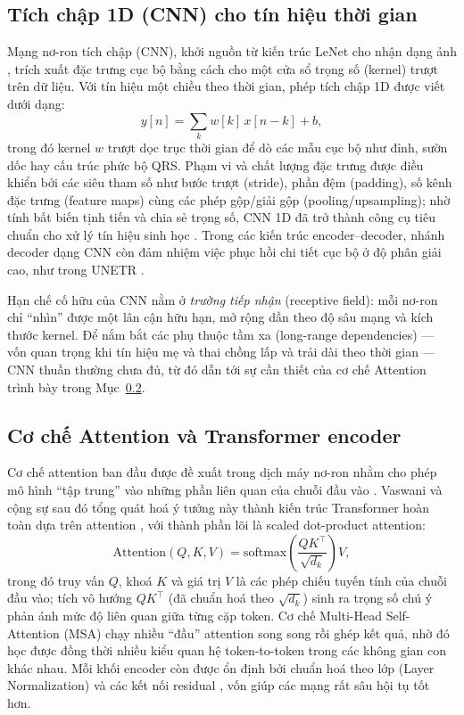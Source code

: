 \documentclass[../DoAn.tex]{subfiles}
\begin{document}
\subsection{Tích chập 1D (CNN) cho tín hiệu thời gian}

Mạng nơ-ron tích chập (CNN), khởi nguồn từ kiến trúc LeNet cho nhận dạng ảnh
\cite{lecunGradientbasedLearningApplied1998}, trích xuất đặc trưng cục bộ bằng cách cho một cửa sổ trọng số
(kernel) trượt trên dữ liệu. Với tín hiệu một chiều theo thời gian, phép tích chập 1D
được viết dưới dạng:
\begin{equation}
  y[n]=\sum_{k} w[k]\,x[n-k]+b,
\end{equation}
trong đó kernel $w$ trượt dọc trục thời gian để dò các mẫu cục bộ như đỉnh, sườn dốc
hay cấu trúc phức bộ QRS. Phạm vi và chất lượng đặc trưng được điều khiển bởi các siêu
tham số như bước trượt (stride), phần đệm (padding), số kênh đặc trưng (feature maps)
cùng các phép gộp/giải gộp (pooling/upsampling); nhờ tính bất biến tịnh tiến và chia sẻ
trọng số, CNN 1D đã trở thành công cụ tiêu chuẩn cho xử lý tín hiệu sinh học
\cite{kiranyaz1DConvolutionalNeural2019}. Trong các kiến trúc encoder--decoder, nhánh decoder dạng CNN còn
đảm nhiệm việc phục hồi chi tiết cục bộ ở độ phân giải cao, như trong UNETR
\cite{hatamizadehUNETRTransformers3D2021}.

Hạn chế cố hữu của CNN nằm ở \emph{trường tiếp nhận} (receptive field): mỗi nơ-ron chỉ
``nhìn'' được một lân cận hữu hạn, mở rộng dần theo độ sâu mạng và kích thước kernel.
Để nắm bắt các phụ thuộc tầm xa (long-range dependencies) --- vốn quan trọng khi tín
hiệu mẹ và thai chồng lấp và trải dài theo thời gian --- CNN thuần thường chưa đủ, từ đó
dẫn tới sự cần thiết của cơ chế Attention trình bày trong Mục~\ref{sec:attention}.

\subsection{Cơ chế Attention và Transformer encoder}
\label{sec:attention}

Cơ chế attention ban đầu được đề xuất trong dịch máy nơ-ron nhằm cho phép mô hình
``tập trung'' vào những phần liên quan của chuỗi đầu vào \cite{bahdanauNeuralMachineTranslation2016}.
Vaswani và cộng sự sau đó tổng quát hoá ý tưởng này thành kiến trúc Transformer hoàn
toàn dựa trên attention \cite{vaswaniAttentionAllYou2023}, với thành phần lõi là scaled
dot-product attention:
\begin{equation}
  \mathrm{Attention}(Q,K,V)=\mathrm{softmax}\!\left(\frac{QK^\top}{\sqrt{d_k}}\right)V,
\end{equation}
trong đó truy vấn $Q$, khoá $K$ và giá trị $V$ là các phép chiếu tuyến tính của chuỗi
đầu vào; tích vô hướng $QK^\top$ (đã chuẩn hoá theo $\sqrt{d_k}$) sinh ra trọng số chú
ý phản ánh mức độ liên quan giữa từng cặp token. Cơ chế Multi-Head Self-Attention (MSA)
chạy nhiều ``đầu'' attention song song rồi ghép kết quả, nhờ đó học được đồng thời nhiều
kiểu quan hệ token-to-token trong các không gian con khác nhau. Mỗi khối encoder còn
được ổn định bởi chuẩn hoá theo lớp (Layer Normalization) \cite{baLayerNormalization2016} và các kết
nối residual \cite{heDeepResidualLearning2015}, vốn giúp các mạng rất sâu hội tụ tốt hơn.
\end{document}
